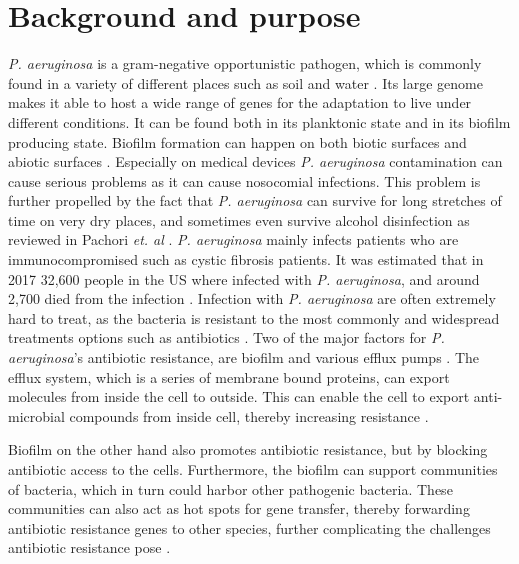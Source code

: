 \section{Background and purpose}
\textit{P. aeruginosa} is a gram-negative opportunistic pathogen, which is commonly found in a variety of different places such as soil and water \cite{Chatterjee2017EnvironmentalAeruginosa}.
Its large genome makes it able to host a wide range of genes for the adaptation to live under different conditions. It can be found both in its planktonic state and in its biofilm producing state. Biofilm formation can happen on both biotic surfaces and abiotic surfaces \cite{Laborda2021PseudomonasOrigin}. 
Especially on medical devices \textit{P. aeruginosa} contamination can cause serious problems as it can cause nosocomial infections. This problem is further propelled by the fact that \textit{P. aeruginosa} can survive for long stretches of time on very dry places, and sometimes even survive alcohol disinfection as reviewed in Pachori \textit{et. al} \cite{Pachori2019EmergenceReview}\cite{Laborda2021PseudomonasOrigin}.
\textit{P. aeruginosa} mainly infects patients who are immunocompromised such as cystic fibrosis patients. It was estimated that in 2017 32,600 people in the US where infected with \textit{P. aeruginosa}, and around 2,700 died from the infection \cite{MULTIDRUG-RESISTANTAERUGINOSA}. Infection with \textit{P. aeruginosa} are often extremely hard to treat, as the bacteria is resistant to the most commonly and widespread treatments options such as antibiotics \cite{Laborda2021PseudomonasOrigin}. 
Two of the major factors for \textit{P. aeruginosa}'s antibiotic resistance, are biofilm and various efflux pumps \cite{Laborda2021PseudomonasOrigin}. The efflux system, which is a series of membrane bound proteins, can export molecules from inside the cell to outside. This can enable the cell to export anti-microbial compounds from inside cell, thereby increasing resistance \cite{Perron2004CzcR-CzcSAeruginosa}. 
 
Biofilm on the other hand also promotes antibiotic resistance, but by blocking antibiotic access to the cells. Furthermore, the biofilm can support communities of bacteria, which in turn could harbor other pathogenic bacteria. These communities can also act as hot spots for gene transfer, thereby forwarding antibiotic resistance genes to other species, further complicating the challenges antibiotic resistance pose \cite{Madigan2022BrockMicroorganisms}.

